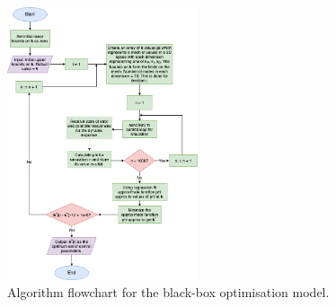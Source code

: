 \documentclass[conference]{IEEEtran}
\theoremstyle{definition}
\begin{document}
\newpage
\appendix
\begin{figure}[h]
    \centering
    \includegraphics[width=0.5\textwidth]{algo.png}
    \caption{Algorithm flowchart for the black-box optimisation model.}
    \label{algo_chart}
\end{figure}
\end{document}
